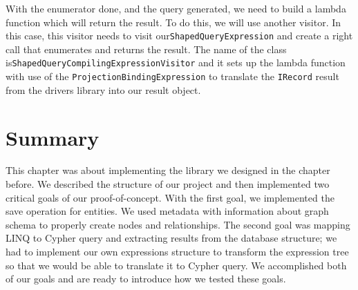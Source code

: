 With the enumerator done, and the query generated, we need to build a lambda function which will return the result.
To do this, we will use another visitor. In this case, this visitor needs to visit our\linebreak\texttt{ShapedQueryExpression} and create a right call that enumerates and returns the result.
The name of the class is\linebreak\texttt{ShapedQueryCompilingExpressionVisitor} and it sets up the lambda function with use of the \texttt{ProjectionBindingExpression} to translate the \texttt{IRecord} result from the drivers library into our result object.

\section{Summary}

This chapter was about implementing the library we designed in the chapter before.
We described the structure of our project and then implemented two critical goals of our proof-of-concept.
With the first goal, we implemented the save operation for entities.
We used metadata with information about graph schema to properly create nodes and relationships.
The second goal was mapping LINQ to Cypher query and extracting results from the database structure; we had to implement our own expressions structure to transform the expression tree so that we would be able to translate it to Cypher query.
We accomplished both of our goals and are ready to introduce how we tested these goals.
